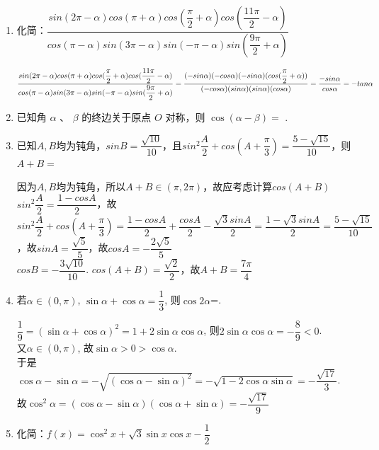 \begin{enumerate}
    \item 化简：$\dfrac{sin(2\pi-\alpha)cos(\pi+\alpha)cos(\dfrac{\pi}{2}+\alpha)cos(\dfrac{11\pi}{2}-\alpha)}{cos(\pi-\alpha)sin(3\pi-\alpha)sin(-\pi-\alpha)sin(\dfrac{9\pi}{2}+\alpha)}$
    \begin{jieda}
        $\dfrac{sin(2\pi-\alpha)cos(\pi+\alpha)cos(\dfrac{\pi}{2}+\alpha)cos(\dfrac{11\pi}{2}-\alpha)}{cos(\pi-\alpha)sin(3\pi-\alpha)sin(-\pi-\alpha)sin(\dfrac{9\pi}{2}+\alpha)} \\ = \dfrac{(-sin\alpha)(-cos\alpha)(-sin\alpha)(cos(\dfrac{\pi}{2}+\alpha))}{(-cos\alpha)(sin\alpha)(sin\alpha)(cos\alpha)} = \dfrac{-sin\alpha}{cos\alpha} = -tan\alpha$    
    \end{jieda}
    \item 已知角 $\alpha$ 、 $\beta$ 的终边关于原点 $O$ 对称，则 $\cos \left( {\alpha  - \beta }\right)  =$ .
    
    \item 已知$A, B$均为钝角，$sinB = \dfrac{\sqrt{10}}{10}$，且$sin^2\dfrac{A}{2} + cos\left(A+\dfrac{\pi}{3}\right) = \dfrac{5-\sqrt{15}}{10}$，则$A+B = $
    \begin{jieda}
        因为$A, B$均为钝角，所以$A+B \in (\pi, 2\pi)$，故应考虑计算$cos(A+B)$ \\
        $sin^2\dfrac{A}{2} = \dfrac{1-cosA}{2}$，故$sin^2\dfrac{A}{2} + cos\left(A+\dfrac{\pi}{3}\right) = \dfrac{1-cosA}{2} + \dfrac{cosA}{2} - \dfrac{\sqrt{3}sinA}{2} = \dfrac{1-\sqrt{3}sinA}{2} = \dfrac{5-\sqrt{15}}{10}$，故$sinA = \dfrac{\sqrt{5}}{5}$，故$cosA = -\dfrac{2\sqrt{5}}{5}$ \\
        $cosB = -\dfrac{3\sqrt{10}}{10}$. $cos(A+B) = \dfrac{\sqrt{2}}{2}$，故$A+B = \dfrac{7\pi}{4}$
    \end{jieda}
    
    \item 若$\alpha\in(0,\pi)$, $\sin\alpha+\cos\alpha=\dfrac{1}{3}$, 则$\cos2\alpha$=. 
    \begin{jieda}
        $\dfrac{1}{9}=(\sin\alpha+\cos\alpha)^2=1+2\sin\alpha\cos\alpha$, 则$2\sin\alpha\cos\alpha=-\dfrac{8}{9}<0$. \\
    又$\alpha\in(0,\pi)$, 故$\sin\alpha>0>\cos\alpha$. \\
    于是$\cos\alpha-\sin\alpha=-\sqrt{(\cos\alpha-\sin\alpha)^2}=-\sqrt{1-2\cos\alpha\sin\alpha}=-\dfrac{\sqrt{17}}{3}$. \\
    故$\cos^2\alpha=(\cos\alpha-\sin\alpha)(\cos\alpha+\sin\alpha)=-\dfrac{\sqrt{17}}{9}$
    \end{jieda}
    \item 化简：$f\left( x\right)  = {\cos }^{2}x + \sqrt{3}\sin x\cos x - \dfrac{1}{2}$  


\end{enumerate}
